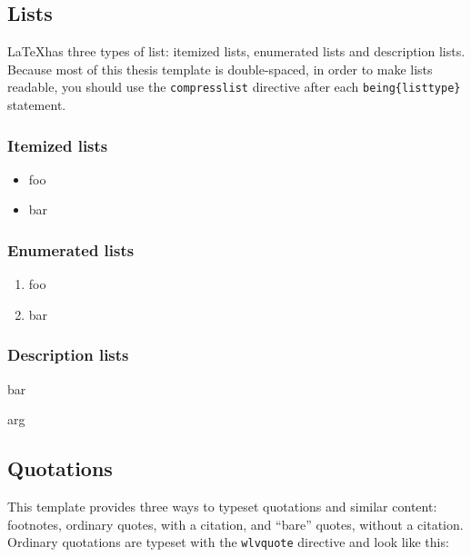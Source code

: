 \subsection{Lists} 

\LaTeX has three types of list: itemized lists, enumerated lists and
description lists. Because most of this thesis template is
double-spaced, in order to make lists readable, you should use the
\verb!compresslist! directive after each \verb!being{listtype}!
statement. 

\subsubsection{Itemized lists}

\begin{itemize}\compresslist{}
\item foo
\item bar
\end{itemize}

\subsubsection{Enumerated lists}

\begin{enumerate}\compresslist{}
\item foo
\item bar
\end{enumerate}

\subsubsection{Description lists}

\begin{description}\compresslist{}
\item [foo] bar
\item [baz] arg
\end{description}

\subsection{Quotations}

This template provides three ways to typeset quotations and similar
content: footnotes, ordinary quotes,
with a citation, and ``bare'' quotes, without a citation. Ordinary
quotations are typeset with the \verb!wlvquote! directive and look
like this:

